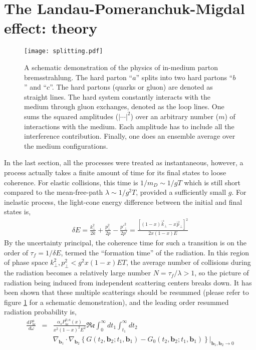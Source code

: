 \section{The Landau-Pomeranchuk-Migdal effect: theory}
\begin{figure}
\singlespacing
\centering
\texttt{[image: splitting.pdf]}
\caption[A schematic demonstration of the physics of in-medium parton]{A schematic demonstration of the physics of in-medium parton bremsstrahlung. The hard parton ``$a$'' splits into two hard partons ``$b$'' and ``$c$''. The hard partons (quarks or gluon) are denoted as straight lines. The hard system constantly interacts with the medium through gluon exchanges, denoted as the loop lines. One sums the squared amplitudes ($|\cdots|^2$) over an arbitrary number ($m$) of interactions with the medium. Each amplitude has to include all the interference contribution.
Finally, one does an ensemble average over the medium configurations.}
\label{fig:split}
\end{figure}
In the last section, all the processes were treated as instantaneous, however, a process actually takes a finite amount of time for its final states to loose coherence. 
For elastic collisions, this time is $1/m_D \sim 1/gT$ which is still short compared to the mean-free-path $\lambda \sim 1/g^2 T$, provided a sufficiently small $g$.
For inelastic process, the light-cone energy difference between the initial and final states is,
\begin{eqnarray}
\delta E = \frac{k_\perp^2}{2k} + \frac{p_\perp^2}{2p} - \frac{{p'}_\perp^2}{2{p'}} = \frac{ [(1-x)\vec{k}_\perp - x\vec{p}_\perp]^2}{2x(1-x)E}
\end{eqnarray}
By the uncertainty principal, the coherence time for such a transition is on the order of $\tau_f = 1/\delta E$, termed the ``formation time'' of the radiation. 
In this region of phase space $k_\perp^2, p_\perp^2 < g^2x(1-x)ET$, the average number of collisions during the radiation becomes a relatively large number $N = \tau_f/\lambda >1$, so the picture of radiation being induced from independent scattering centers breaks down.
It has been shown that these multiple scatterings should be resummed \cite{Zakharov:1996fv,Zakharov:1997uu,Baier:1996kr} (please refer to figure \ref{fig:split} for a schematic demonstration), and the leading order resummed radiation probability is,
\begin{eqnarray}
\frac{dP^{a}_{bc}}{d\omega} &=& \frac{\alpha_s P^{0,a}_{bc}(x)}{x^2(1-x)^2 E^2}\mathfrak{Re}\int_0^\infty dt_1 \int_{t_1}^{\infty} dt_2\\\nonumber &&\nabla_{\mathbf{b}_1} \cdot\nabla_{\mathbf{b}_2} \left\{G(t_2, \mathbf{b}_2; t_1, \mathbf{b}_1) - G_0(t_2, \mathbf{b}_2; t_1, \mathbf{b}_1) \right\}|_{\mathbf{b}_1, \mathbf{b}_2 \rightarrow 0}
\label{eq:theory-dR}
\end{eqnarray}
